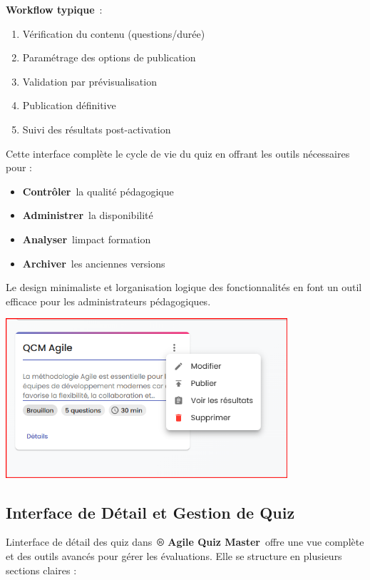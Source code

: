 \documentclass[12pt,a4paper,twoside]{report}
\begin{document}
\textbf{Workflow typique}~:

\begin{enumerate}
\def\labelenumi{\arabic{enumi}.}
\item
  Vérification du contenu (questions/durée)
\item
  Paramétrage des options de publication
\item
  Validation par prévisualisation
\item
  Publication définitive
\item
  Suivi des résultats post-activation
\end{enumerate}

Cette interface complète le cycle de vie du quiz en offrant les outils
nécessaires pour :

\begin{itemize}
\item
  \textbf{Contrôler}~la qualité pédagogique
\item
  \textbf{Administrer}~la disponibilité
\item
  \textbf{Analyser}~l\textquotesingle impact formation
\item
  \textbf{Archiver}~les anciennes versions
\end{itemize}

Le design minimaliste et l\textquotesingle organisation logique des
fonctionnalités en font un outil efficace pour les administrateurs
pédagogiques.

\includegraphics[width=4.11827in,height=2.32651in]{latex_media/media/image59.png}

\hypertarget{interface-de-duxe9tail-et-gestion-de-quiz}{%
\subsection{Interface de Détail et Gestion de
Quiz}\label{interface-de-duxe9tail-et-gestion-de-quiz}}

L\textquotesingle interface de détail des quiz dans~\textbf{® Agile Quiz
Master}~offre une vue complète et des outils avancés pour gérer les
évaluations. Elle se structure en plusieurs sections claires :
\end{document}
